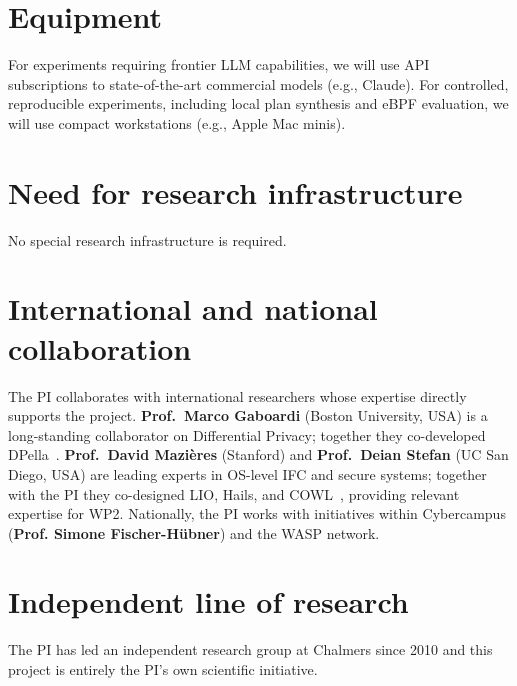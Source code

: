 \documentclass{kaw}
\begin{document}
\section{Equipment}

%
For experiments requiring frontier LLM capabilities, we will use API
subscriptions to state-of-the-art commercial models (e.g., Claude).
%
For controlled, reproducible experiments, including
local plan synthesis and eBPF evaluation, we will use compact workstations
(e.g., Apple Mac minis). 

\section{Need for research infrastructure}

No special research infrastructure is required.

\section{International and national collaboration}
%
The PI collaborates with international researchers whose expertise
directly supports the project. 
%
\textbf{Prof.\ Marco Gaboardi} (Boston University, USA) is a long-standing
collaborator on Differential Privacy; together they co-developed
DPella~\cite{LoboVesga:SP20,LoboVesga:TOPLAS21,LoboVesga:OOPSLA24}. 
%
\textbf{Prof.\ David Mazières} (Stanford) and \textbf{Prof.\ Deian Stefan}
(UC San Diego, USA) are leading experts in OS-level IFC and secure systems;
together with the PI they co-designed LIO, Hails, 
and COWL~\cite{stefan:lio,stefan:addressing-covert,giffin:hails,COWL},
providing relevant expertise for WP2.
%
Nationally, the PI works with initiatives within Cybercampus (\textbf{Prof.
Simone Fischer-H\"ubner}) and the WASP network. 

\section{Independent line of research}

The PI has led an independent research group at Chalmers since 2010 
and this project is entirely the PI's own scientific initiative. 
%

\small



\label{lastpage}
\end{document}
